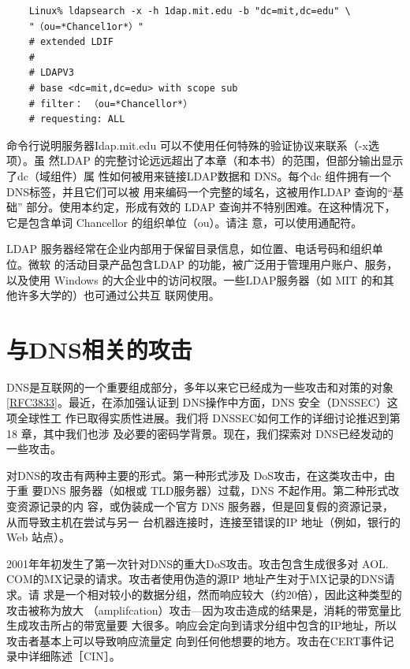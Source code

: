 \begin{verbatim}
    Linux% ldapsearch -x -h 1dap.mit.edu -b "dc=mit,dc=edu" \
    "（ou=*Chancel1or*）"
    # extended LDIF
    #
    # LDAPV3
    # base <dc=mit,dc=edu> with scope sub
    # filter： （ou=*Chancellor*）
    # requesting: ALL
\end{verbatim}

命令行说明服务器Idap.mit.edu 可以不使用任何特殊的验证协议来联系（-x选项）。虽
然LDAP 的完整讨论远远超出了本章（和本书）的范围，但部分输出显示了dc（域组件）属
性如何被用来链接LDAP数据和 DNS。每个dc 组件拥有一个 DNS标签，并且它们可以被
用来编码一个完整的域名，这被用作LDAP 查询的“基础” 部分。使用本约定，形成有效的
LDAP 查询并不特别困难。在这种情况下，它是包含单词 Chancellor 的组织单位（ou）。请注
意，可以使用通配符。

LDAP 服务器经常在企业内部用于保留目录信息，如位置、电话号码和组织单位。微软
的活动目录产品包含LDAP 的功能，被广泛用于管理用户账户、服务，以及使用 Windows
的大企业中的访问权限。一些LDAP服务器（如 MIT 的和其他许多大学的）也可通过公共互
联网使用。

\section{与DNS相关的攻击}

DNS是互联网的一个重要组成部分，多年以来它已经成为一些攻击和对策的对象
\href{https://www.rfc-editor.org/rfc/rfc3833}{[RFC3833]}。最近，在添加强认证到 DNS操作中方面，DNS 安全（DNSSEC）这项全球性工
作已取得实质性进展。我们将 DNSSEC如何工作的详细讨论推迟到第18 章，其中我们也涉
及必要的密码学背景。现在，我们探索对 DNS已经发动的一些攻击。

对DNS的攻击有两种主要的形式。第一种形式涉及 DoS攻击，在这类攻击中，由于重
要DNS 服务器（如根或 TLD服务器）过载，DNS 不起作用。第二种形式改变资源记录的内
容，或伪装成一个官方 DNS 服务器，但是回复假的资源记录，从而导致主机在尝试与另一
台机器连接时，连接至错误的IP 地址（例如，银行的Web 站点）。

2001年年初发生了第一次针对DNS的重大DoS攻击。攻击包含生成很多对 AOL.
COM的MX记录的请求。攻击者使用伪造的源IP 地址产生对于MX记录的DNS请求。请
求是一个相对较小的数据分组，然而响应较大（约20倍），因此这种类型的攻击被称为放大
（amplifcation）攻击—因为攻击造成的结果是，消耗的带宽量比生成攻击所占的带宽量要
大很多。响应会定向到请求分组中包含的IP地址，所以攻击者基本上可以导致响应流量定
向到任何他想要的地方。攻击在CERT事件记录中详细陈述［CIN］。

